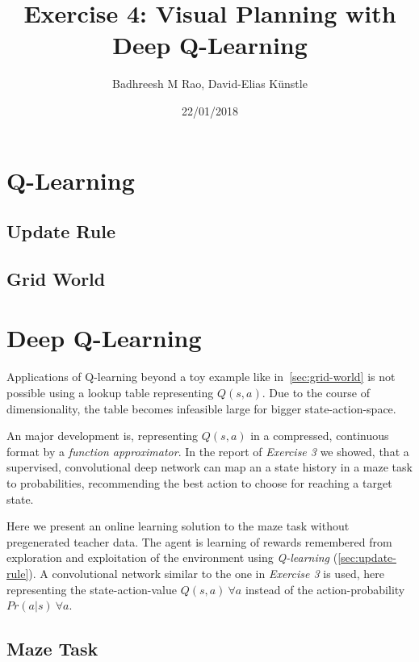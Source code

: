 \documentclass[a4paper,14pt]{article}
\begin{document}
\title{Exercise 4: Visual Planning with Deep Q-Learning}
\author{Badhreesh M Rao, David-Elias K\"unstle}
\date{22/01/2018}
\maketitle
\section{Q-Learning}\label{sec:q-learning}
\subsection{Update Rule}\label{sec:update-rule}
\subsection{Grid World}\label{sec:grid-world}
\section{Deep Q-Learning}\label{sec:deep-q-learning}

Applications of Q-learning beyond a toy example like
in~\autoref{sec:grid-world} is not possible using a lookup table representing
$Q(s, a)$.
Due to the course of dimensionality, the table becomes infeasible large for
bigger state-action-space.

An major development is, representing $Q(s, a)$ in a compressed, continuous
format by a \textit{function approximator}.
In the report of \textit{Exercise 3} we showed, that a supervised, convolutional
deep network can map an a state history in a maze task to probabilities, recommending
the best action to choose for reaching a target state.

Here we present an online learning solution to the maze task without
pregenerated teacher data.
The agent is learning of rewards remembered from exploration and exploitation of the environment using
\textit{Q-learning} (\autoref{sec:update-rule}).
A convolutional network similar to the one in \textit{Exercise 3} is used, here
representing the state-action-value $Q(s, a)~\forall a$
 instead of the action-probability $Pr(a|s)~\forall a$.

\subsection{Maze Task}
\end{document}
